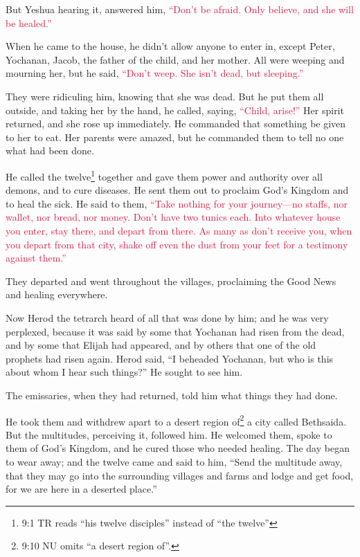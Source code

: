 \myverse{}But Yeshua hearing it, answered him,
\textcolor{crimson}{“Don’t be afraid. Only believe, and she will be healed.”}

\myverse{}When he came to the house, he didn’t allow anyone to enter in,
except Peter, Yochanan, Jacob, the father of the child, and her mother.
\myverse{}All were weeping and mourning her, but he said,
\textcolor{crimson}{“Don’t weep. She isn’t dead, but sleeping.”}

\myverse{}They were ridiculing him, knowing that she was dead.
\myverse{}But he put them all outside, and taking her by the hand, he called, saying,
\textcolor{crimson}{“Child, arise!”}
\myverse{}Her spirit returned, and she rose up immediately. He commanded that something
be given to her to eat.
\myverse{}Her parents were amazed, but he commanded them to tell no one what had been
done.


\mychapter{} \myverse*{}He called the twelve\footnote{9:1 TR reads “his twelve disciples” instead of “the twelve”} together and gave them power
and authority over all demons, and to cure diseases.
\myverse{}He sent them out to proclaim God’s Kingdom and to heal the sick.
\myverse{}He said to them,
\textcolor{crimson}{“Take nothing for your journey—no staffs, nor wallet, nor bread, nor money. Don’t have two tunics
	each.
}
\myverse{}\textcolor{crimson}{Into whatever house you enter, stay there, and depart from there.
}
\myverse{}\textcolor{crimson}{As many as don’t receive you, when you depart from that city, shake off
	even the dust from your feet for a testimony against them.”}

\myverse{}They departed and went throughout the villages, proclaiming the
Good News and healing everywhere.

\myverse{}Now Herod the tetrarch heard of all that was done by him; and he
was very perplexed, because it was said by some that Yochanan had risen from the dead,
\myverse{}and by some that Elijah had appeared, and by others that one of the old prophets
had risen again.
\myverse{}Herod said, “I beheaded Yochanan, but who is this about whom I hear such things?”
He sought to see him.

\myverse{}The emissaries, when they had returned, told him what things
they had done.

He took them and withdrew apart to a desert region of\footnote{9:10 NU omits “a desert region of”.} a city called Bethsaida.
\myverse{}But the multitudes, perceiving it, followed him. He welcomed them, spoke to
them of God’s Kingdom, and he cured those who needed healing.
\myverse{}The day began to wear away; and the twelve came and said to him, “Send the
multitude away, that they may go into the surrounding villages and farms and lodge and get food, for we
are here in a deserted place.”


